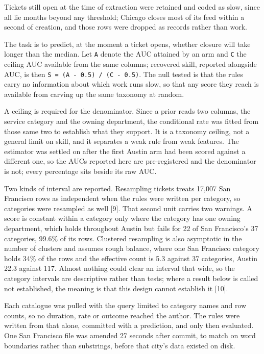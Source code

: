 \documentclass[10pt,a4paper,twocolumn]{article}
\begin{document}
Tickets still open at the time of extraction were retained and coded as slow,
since all lie months beyond any threshold; Chicago closes most of its feed
within a second of creation, and those rows were dropped as records rather than
work.

The task is to predict, at the moment a ticket opens, whether closure will take
longer than the median. Let \texttt{A} denote the AUC attained by an arm and \texttt{C} the
ceiling AUC available from the same columns; recovered skill, reported alongside
AUC, is then \texttt{S = (A - 0.5) / (C - 0.5)}. The null tested is that the rules
carry no information about which work runs slow, so that any score they reach is
available from carving up the same taxonomy at random.

A ceiling is required for the denominator. Since a prior reads two columns, the
service category and the owning department, the conditional rate was fitted from
those same two to establish what they support. It is a taxonomy ceiling, not a
general limit on skill, and it separates a weak rule from weak features. The
estimator was settled on after the first Austin arm had been scored against a
different one, so the AUCs reported here are pre-registered and the denominator
is not; every percentage sits beside its raw AUC.

Two kinds of interval are reported. Resampling tickets treats 17,007 San
Francisco rows as independent when the rules were written per category, so
categories were resampled as well [9]. That second unit carries two warnings. A
score is constant within a category only where the category has one owning
department, which holds throughout Austin but fails for 22 of San Francisco's 37
categories, 99.6\% of its rows. Clustered resampling is also asymptotic in the
number of clusters and assumes rough balance, where one San Francisco category
holds 34\% of the rows and the effective count is 5.3 against 37 categories,
Austin 22.3 against 117. Almost nothing could clear an interval that wide, so
the category intervals are descriptive rather than tests; where a result below
is called not established, the meaning is that this design cannot establish it
[10].

Each catalogue was pulled with the query limited to category names and row
counts, so no duration, rate or outcome reached the author. The rules were
written from that alone, committed with a prediction, and only then evaluated.
One San Francisco file was amended 27 seconds after commit, to match on word
boundaries rather than substrings, before that city's data existed on disk.
\end{document}
